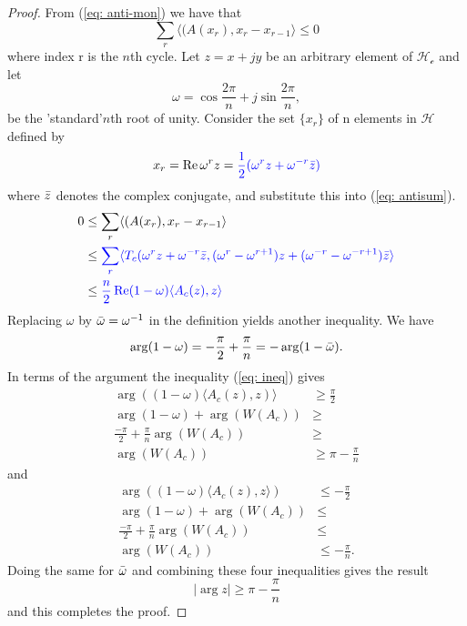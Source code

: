 \begin{proof}
    From (\ref{eq: anti-mon}) we have that 
    \begin{equation}
        \sum_{r} \langle(A(x_r), x_r-x_{r-1} \rangle \leq 0
        \label{eq: antisum}
    \end{equation}
    where index r is the $n$th cycle. Let $z = x + jy$ be an arbitrary element of $\mathcal{H_c}$ and let 
    \begin{equation}
        \omega = \cos{\frac{2\pi}{n}} + j \sin{\frac{2\pi}{n}},
    \end{equation}
    be the 'standard'$n$th root of unity. Consider the set $\{x_r\}$ of n elements in $\mathcal{H}$ defined by
    \begin{equation}
        x_r = \Re\omega^{r}z = \color{blue}\frac{1}{2}(\omega^{r}z+\omega^{-r}\Bar{z})
    \end{equation}
    where $\Bar{z}$ denotes the complex conjugate, and substitute this into (\ref{eq: antisum}).
    \begin{align}
        0 &\leq \sum_{r} \langle(A(x_r), x_r-x_{r-1} \rangle \\
        & \leq \color{blue} \sum_{r} \langle T_{c}(\omega^{r}z +\omega^{-r}\Bar{z} , (\omega^{r} - \omega^{r+1})z + (\omega^{-r} - \omega^{-r+1})\Bar{z} \rangle \\
        & \leq \color{blue} \frac{n}{2} \Re (1-\omega)\langle A_c(z), z \rangle 
        \label{eq: ineq}
    \end{align}
    Replacing $\omega$ by $\Bar{\omega} = \omega^{-1}$ in the definition yields another inequality.
    We have
    \begin{equation}
        \arg (1-\omega) = -\frac{\pi}{2} + \frac{\pi}{n} = -\arg(1-\Bar{\omega}).
    \end{equation}
    In terms of the argument  the inequality (\ref{eq: ineq}) gives 
    \begin{align}
                \arg \left( (1-\omega)\langle A_c(z), z \right)\rangle & \geq \frac{\pi}{2}  \\
                \arg (1-\omega) + \arg (W(A_c)) & \geq \\
                \frac{-\pi}{2} + \frac{\pi}{n} \arg (W(A_c)) & \geq \\
                \arg (W(A_c)) & \geq \pi - \frac{\pi}{n}
    \end{align}
    and
    \begin{align}
        \arg \left( (1-\omega)\langle A_c(z), z \rangle \right) &  \leq -\frac{\pi}{2} \\
        \arg (1-\omega) + \arg (W(A_c)) & \leq \\
        \frac{-\pi}{2} + \frac{\pi}{n} \arg (W(A_c)) & \leq \\
        \arg (W(A_c)) & \leq - \frac{\pi}{n}.
    \end{align}
    Doing the same for $\Bar{\omega}$ and combining these four inequalities gives the result
    \begin{equation}
       \lvert \arg z \rvert \geq \pi - \frac{\pi}{n}
    \end{equation}
    and this completes the proof.
\end{proof}
